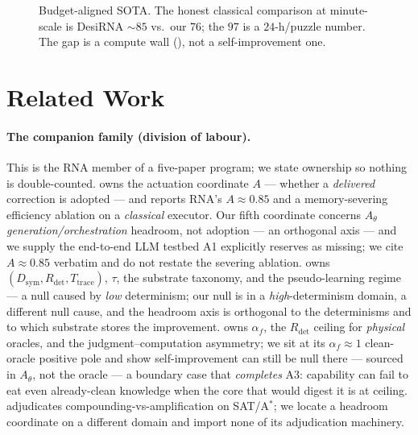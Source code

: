 \documentclass[11pt]{article}
\newcommand{\Dsym}{D_{\mathrm{sym}}}
\newcommand{\Rdet}{R_{\mathrm{det}}}
\newcommand{\Ttrace}{T_{\mathrm{trace}}}
\newcommand{\Ath}{A_{\theta}}
\newcommand{\af}{\alpha_f}
\begin{document}
\begin{figure}[t]\centering
{}
\caption{Budget-aligned SOTA. The honest classical comparison at minute-scale is DesiRNA $\sim\!85$ vs.\
our $76$; the $97$ is a $24$-h/puzzle number. The gap is a compute wall (\citealp{oracleresidue}), not a
self-improvement one.}
\label{fig:sota}
\end{figure}

\section{Related Work}\label{sec:related}
\paragraph{The companion family (division of labour).} This is the RNA member of a five-paper program;
we state ownership so nothing is double-counted. \citet{actuation} owns the actuation coordinate $A$ ---
whether a \emph{delivered} correction is adopted --- and reports RNA's $A\!\approx\!0.85$ and a
memory-severing efficiency ablation on a \emph{classical} executor. Our fifth coordinate concerns $\Ath$
\emph{generation/orchestration} headroom, not adoption --- an orthogonal axis --- and we supply the
end-to-end LLM testbed A1 explicitly reserves as missing; we cite $A\!\approx\!0.85$ verbatim and do not
restate the severing ablation. \citet{determinismmanifold} owns $(\Dsym,\Rdet,\Ttrace)$, $\tau$, the
substrate taxonomy, and the pseudo-learning regime --- a null caused by \emph{low} determinism; our null
is in a \emph{high}-determinism domain, a different null cause, and the headroom axis is orthogonal to
the determinisms and to which substrate stores the improvement. \citet{oracleresidue} owns $\af$, the
$\Rdet$ ceiling for \emph{physical} oracles, and the judgment--computation asymmetry; we sit at its
$\af\!\approx\!1$ clean-oracle positive pole and show self-improvement can still be null there --- sourced
in $\Ath$, not the oracle --- a boundary case that \emph{completes} A3: capability can fail to eat even
already-clean knowledge when the core that would digest it is at ceiling. \citet{compoundingprofile}
adjudicates compounding-vs-amplification on SAT/A$^\ast$; we locate a headroom coordinate on a different
domain and import none of its adjudication machinery.
\end{document}
